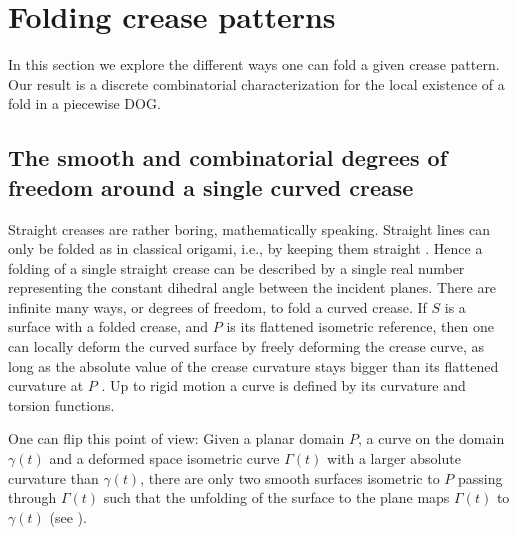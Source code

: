 
\section{Folding crease patterns} \label{sec:folding}
In this section we explore the different ways one can fold a given crease pattern. Our result is a discrete combinatorial characterization for the local existence of a fold in a piecewise DOG.

\subsection{The smooth and combinatorial degrees of freedom around a single curved crease}
Straight creases are rather boring, mathematically speaking. Straight lines can only be folded as in classical origami, i.e., by keeping them straight \cite{demaine_lens}.  Hence a folding of a single straight crease can be described by a single real number representing the constant dihedral angle between the incident planes. There are infinite many ways, or degrees of freedom, to fold a curved crease. If $S$ is a surface with a folded crease, and $P$ is its flattened isometric reference, then one can locally deform the curved surface by freely deforming the crease curve, as long as the absolute value of the crease curvature stays bigger than its flattened curvature at $P$ \cite{more_on_paper}. Up to rigid motion a curve is defined by its curvature and torsion functions.

One can flip this point of view: Given a planar domain $P$, a curve on the domain $\gamma(t)$ and a deformed space isometric curve $\Gamma(t)$ with a larger absolute curvature than $\gamma(t)$, there are only two smooth surfaces isometric to $P$ passing through $\Gamma(t)$ such that the unfolding of the surface to the plane maps $\Gamma(t)$ to $\gamma(t)$ \cite{mathematical_omnibus} (see ).


